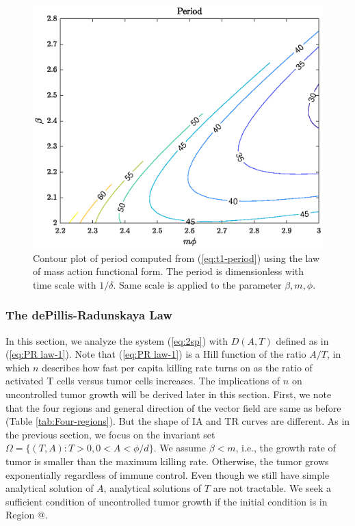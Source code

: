 \documentclass[review,authoryear]{elsarticle}
\makeatletter
\newcommand*{\rom}[1]{\expandafter\@slowromancap\romannumeral #1@}
\makeatother
\begin{document}
\begin{figure}
\centering
\includegraphics[width=0.8\linewidth]{figs/DA-period-contour}
\caption{\label{fig:Contour-plot-of-period}Contour plot of period computed
from (\ref{eq:t1-period}) using the law of mass action functional form. The period is dimensionless with time scale
with $1/ \delta$. Same scale is applied to the parameter $\beta,m,\phi$. }
\end{figure}


\subsubsection{The dePillis-Radunskaya Law}
In this section, we analyze the system (\ref{eq:2sp}) with $D(A,T)$
defined as in  (\ref{eq:PR law-1}). Note that (\ref{eq:PR law-1}) is a Hill
function of the ratio $A/T$, in which $n$ describes how fast per capita
killing rate turns on as the ratio of activated T cells versus tumor cells increases.
The implications of $n$ on uncontrolled tumor growth will be derived later in this section.
First, we note that the four regions and general direction of the vector field are same as before (Table \ref{tab:Four-regions}). But the shape of IA and TR curves are different. As in the previous section, we focus on the
invariant set $\Omega=\{(T,A):T>0,0<A<\phi/d\}$. We assume $\beta<m$, i.e.,
the growth rate of tumor is smaller than the maximum killing rate.
Otherwise, the tumor grows exponentially regardless of immune control.
Even though we still have simple analytical solution of $A$, analytical
solutions of $T$ are not tractable. We seek a sufficient condition
of uncontrolled tumor growth if the initial condition is in Region \rom{2}. 
\end{document}
